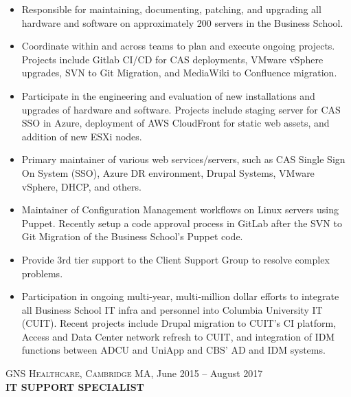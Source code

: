 \documentclass[]{article}
\begin{document}
\begin{itemize}
\item
  Responsible for maintaining, documenting, patching, and upgrading all
  hardware and software on approximately 200 servers in the Business
  School.
\item
  Coordinate within and across teams to plan and execute ongoing
  projects. Projects include Gitlab CI/CD for CAS deployments, VMware
  vSphere upgrades, SVN to Git Migration, and MediaWiki to Confluence
  migration.
\item
  Participate in the engineering and evaluation of new installations and
  upgrades of hardware and software. Projects include staging server for
  CAS SSO in Azure, deployment of AWS CloudFront for static web assets,
  and addition of new ESXi nodes.
\item
  Primary maintainer of various web services/servers, such as CAS Single
  Sign On System (SSO), Azure DR environment, Drupal Systems, VMware
  vSphere, DHCP, and others.
\item
  Maintainer of Configuration Management workflows on Linux servers
  using Puppet. Recently setup a code approval process in GitLab after
  the SVN to Git Migration of the Business School's Puppet code.
\item
  Provide 3rd tier support to the Client Support Group to resolve
  complex problems.
\item
  Participation in ongoing multi-year, multi-million dollar efforts to
  integrate all Business School IT infra and personnel into Columbia
  University IT (CUIT). Recent projects include Drupal migration to
  CUIT's CI platform, Access and Data Center network refresh to CUIT,
  and integration of IDM functions between ADCU and UniApp and CBS' AD
  and IDM systems.
\end{itemize}

\textsc{GNS Healthcare, Cambridge MA,} June 2015 -- August 2017\\
\textbf{IT SUPPORT SPECIALIST}
\end{document}
